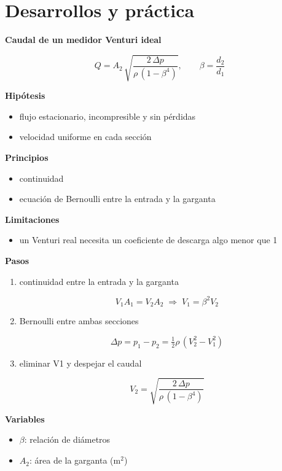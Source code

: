 \documentclass[10pt,openany]{book}
\begin{document}
\section{Desarrollos y práctica}

\begin{tcolorbox}[title={Desarrollos del modelo}, studiumdef, breakable]

\noindent\textbf{Caudal de un medidor Venturi ideal}

\[
Q = A_2\,\sqrt{\frac{2\,\Delta p}{\rho\,(1 - \beta^{4})}},\qquad \beta = \frac{d_2}{d_1}
\]

\noindent\textbf{Hipótesis}
\begin{itemize}
\item flujo estacionario, incompresible y sin pérdidas
\item velocidad uniforme en cada sección
\end{itemize}

\noindent\textbf{Principios}
\begin{itemize}
\item continuidad
\item ecuación de Bernoulli entre la entrada y la garganta
\end{itemize}

\noindent\textbf{Limitaciones}
\begin{itemize}
\item un Venturi real necesita un coeficiente de descarga algo menor que 1
\end{itemize}

\noindent\textbf{Pasos}
\begin{enumerate}
\item
continuidad entre la entrada y la garganta

\[
V_1 A_1 = V_2 A_2 \;\Rightarrow\; V_1 = \beta^{2} V_2
\]
\item
Bernoulli entre ambas secciones

\[
\Delta p = p_1 - p_2 = \tfrac12\rho\,(V_2^{2} - V_1^{2})
\]
\item
eliminar V1 y despejar el caudal

\[
V_2 = \sqrt{\frac{2\,\Delta p}{\rho\,(1 - \beta^{4})}}
\]
\end{enumerate}

\noindent\textbf{Variables}
\begin{itemize}
\item $\beta$: relación de diámetros
\item $A_{2}$: área de la garganta ($\mathrm{m}^{2}$)
\end{itemize}




\end{tcolorbox}
\end{document}
